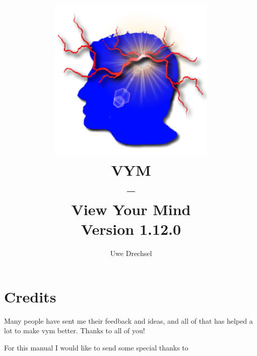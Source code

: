 \documentclass[12pt,a4paper]{article}
\newcommand{\vym}{{\sc vym }}
\begin{document}
\title{
    \includegraphics[width=8cm]{images/vym-logo-new.png}
    \\
VYM \\ -- \\View Your Mind\\ {\small Version 1.12.0}}
\author{\textcopyright Uwe Drechsel  }


\maketitle

\newpage

\tableofcontents

\newpage

\section*{Credits}
Many people have sent me their feedback and ideas, and all of that has
helped a lot to make \vym better. Thanks to all of you!

For this manual I would like to send some special thanks to
\end{document}
